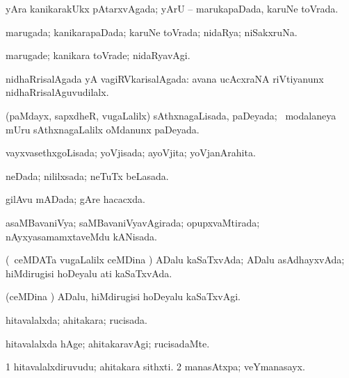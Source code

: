 \bentry
{} 
\gl{\gu}
\expl{}
\bmng
yAra kanikarakUkx pAtarxvAgada; yArU -- marukapaDada, karuNe toVrada. 
\emng
\eentry

\bentry
{} 
\gl{\gu}
\expl{}
\bmng
marugada; kanikarapaDada; karuNe toVrada; nidaRya; niSakxruNa. 
\emng
\eentry

\bentry
{} 
\gl{\kirxvi}
\expl{}
\bmng
marugade; kanikara toVrade; nidaRyavAgi. 
\emng
\eentry

\bentry
{} 
\gl{\gu}
\expl{}
\bmng
nidhaRrisalAgada yA vagiRVkarisalAgada:  avana ucAcxraNA riVtiyanunx nidhaRrisalAguvudilalx. 
\emng
\eentry

\bentry
{} 
\gl{\gu}
\expl{}
\bmng
(paMdayx, sapxdheR, \mo vugaLalilx) sAthxnagaLisada, paDeyada; \kanmu\ modalaneya mUru sAthxnagaLalilx oMdanunx paDeyada. 
\emng
\eentry

\bentry
{} 
\gl{\gu}
\expl{}
\bmng
vayxvasethxgoLisada; yoVjisada; ayoVjita; yoVjanArahita. 
\emng
\eentry

\bentry
{} 
\gl{\gu}
\expl{}
\bmng
neDada; nililxsada; neTuTx beLasada. 
\emng
\eentry

\bentry
{} 
\gl{\gu}
\expl{}
\bmng
gilAvu mADada; gAre hacacxda. 
\emng
\eentry

\bentry
{} 
\gl{\gu}
\expl{}
\bmng
asaMBavaniVya; saMBavaniVyavAgirada; opupxvaMtirada; nAyxyasamamxtaveMdu kANisada. 
\emng
\eentry

\bentry
{} 
\gl{\gu}
\expl{}
\bmng
(\kanmu\ ceMDATa \mo vugaLalilx ceMDina \vi) ADalu kaSaTxvAda; ADalu asAdhayxvAda; hiMdirugisi hoDeyalu ati kaSaTxvAda. 
\emng
\eentry

\bentry
{} 
\gl{\kirxvi}
\expl{}
\bmng
(ceMDina \vi) ADalu, hiMdirugisi hoDeyalu kaSaTxvAgi. 
\emng
\eentry

\bentry
{} 
\gl{\gu}
\expl{}
\bmng
hitavalalxda; ahitakara; rucisada. 
\emng
\eentry

\bentry
{} 
\gl{\kirxvi}
\expl{}
\bmng
hitavalalxda hAge; ahitakaravAgi; rucisadaMte. 
\emng
\eentry

\bentry
{} 
\gl{\nA}
\expl{}
\bmng
\bnum
\num{1} hitavalalxdiruvudu; ahitakara sithxti. 
\num{2} manasAtxpa; veYmanasayx. 
\enum
\emng
\eentry


